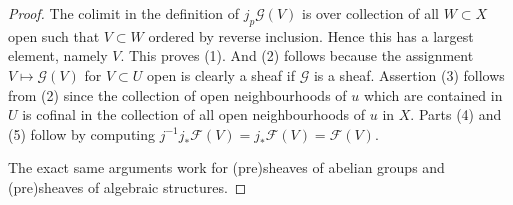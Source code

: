 \documentclass{stacks-project}
\theoremstyle{plain}
\theoremstyle{definition}
\theoremstyle{remark}
\numberwithin{equation}{subsection}
\begin{document}
\begin{proof}
The colimit in the definition of $j_p\mathcal{G}(V)$
is over collection of all $W \subset X$ open such that $V \subset W$
ordered by reverse inclusion.
Hence this has a largest element, namely $V$. This proves (1).
And (2) follows because the assignment $V \mapsto \mathcal{G}(V)$
for $V \subset U$ open is clearly a sheaf if $\mathcal{G}$ is a
sheaf. Assertion (3) follows from (2) since the collection
of open neighbourhoods of $u$ which are contained in $U$ is cofinal
in the collection of all open neighbourhoods of $u$ in $X$.
Parts (4) and (5) follow by computing
$j^{-1}j_*\mathcal{F}(V) = j_*\mathcal{F}(V) = \mathcal{F}(V)$.

\medskip\noindent
The exact same arguments work for (pre)sheaves of abelian groups
and (pre)sheaves of algebraic structures.
\end{proof}
\end{document}
